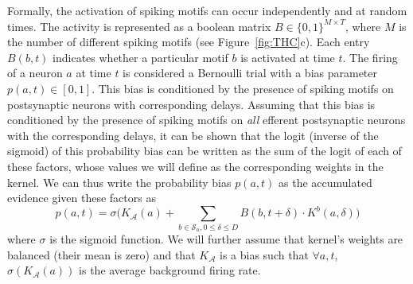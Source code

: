 \documentclass[runningheads]{llncs}
\newcommand{\presynaddr}{a} %
\newcommand{\postsynaddr}{b} %
\newcommand{\presynaddrspace}{\mathcal{A}} %
\newcommand{\synapse}{\mathcal{S}} %
\newcommand{\synapticdelay}{\delta} %
\newcommand{\kernel}{K} %
\begin{document}
Formally, the activation of spiking motifs can occur independently and at random times. The activity is represented as a boolean matrix $B\in \{0, 1\}^{M\times T}$, where $M$ is the number of different spiking motifs (see Figure~\ref{fig:THC}c). Each entry $B(\postsynaddr, t)$ indicates whether a particular motif $\postsynaddr$ is activated at time $t$. The firing of a neuron $\presynaddr$ at time $t$ is considered a Bernoulli trial with a bias parameter $p(\presynaddr, t) \in [0, 1]$. This bias is conditioned by the presence of spiking motifs on postsynaptic neurons with corresponding delays.
Assuming that this bias is conditioned by the presence of spiking motifs on \emph{all} efferent postsynaptic neurons with the corresponding delays, it can be shown that the logit (inverse of the sigmoid) of this probability bias can be written as the sum of the logit of each of these factors, whose values we will define as the corresponding weights in the kernel. We can thus write the probability bias $p(a, t)$ as the accumulated evidence given these factors as 
\begin{equation*}
p(\presynaddr, t) = \sigma\big(\kernel_\presynaddrspace(\presynaddr) + \sum_{\postsynaddr \in \synapse_\presynaddr, 0 \le \synapticdelay \le D} B(\postsynaddr, t+\synapticdelay) \cdot \kernel^\postsynaddr(\presynaddr, \synapticdelay) \big)  
\end{equation*}
where $\sigma$ is the sigmoid function. We will further assume that kernel's weights are balanced (their mean is zero) and that $\kernel_\presynaddrspace$ is a bias such that $\forall \presynaddr, t$, $\sigma(\kernel_\presynaddrspace(\presynaddr))$ is the average background firing rate. 
\end{document}
